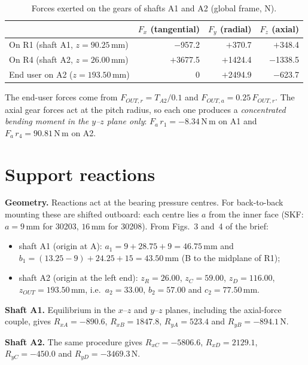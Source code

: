 \documentclass[11pt,a4paper]{article}
\begin{document}
\begin{table}[H]\centering\small
\caption{Forces exerted on the gears of shafts A1 and A2 (global frame, N).}
\begin{tabular}{lrrr}\toprule
 & $F_x$ (tangential) & $F_y$ (radial) & $F_z$ (axial)\\\midrule
On R1 (shaft A1, $z=90.25$\,mm) & $-$957.2 & $+$370.7 & $+$348.4\\
On R4 (shaft A2, $z=26.00$\,mm) & $+$3677.5 & $+$1424.4 & \ensuremath{-}1338.5\\
End user on A2 ($z=193.50$\,mm) & 0 & $+$2494.9 & \ensuremath{-}623.7\\\bottomrule
\end{tabular}\end{table}
The end-user forces come from $F_{OUT,r}=T_{A2}/0.1$ and $F_{OUT,a}=0.25\,F_{OUT,r}$. The axial gear forces act at the pitch radius, so each one produces a \emph{concentrated bending moment in the $y$--$z$ plane only}: $F_{a}\,r_1=\ensuremath{-}8.34$\,N\,m on A1 and $F_{a}\,r_4=90.81$\,N\,m on A2.

\section{Support reactions}
\textbf{Geometry.} Reactions act at the bearing pressure centres. For back-to-back mounting these are shifted outboard: each centre lies $a$ from the inner face (SKF: $a=9$\,mm for 30203, $16$\,mm for 30208). From Figs.~3 and~4 of the brief:
\begin{itemize}
\item shaft A1 (origin at A): $a_1=9+28.75+9=46.75$\,mm and $b_1=(13.25-9)+24.25+15=43.50$\,mm (B to the midplane of R1);
\item shaft A2 (origin at the left end): $z_R=26.00$, $z_C=59.00$, $z_D=116.00$, $z_{OUT}=193.50$\,mm, i.e.\ $a_2=33.00$, $b_2=57.00$ and $c_2=77.50$\,mm.
\end{itemize}

\textbf{Shaft A1.} Equilibrium in the $x$--$z$ and $y$--$z$ planes, including the axial-force couple, gives $R_{xA}=\ensuremath{-}890.6$, $R_{xB}=1847.8$, $R_{yA}=523.4$ and $R_{yB}=\ensuremath{-}894.1$\,N.

\textbf{Shaft A2.} The same procedure gives $R_{xC}=\ensuremath{-}5806.6$, $R_{xD}=2129.1$, $R_{yC}=\ensuremath{-}450.0$ and $R_{yD}=\ensuremath{-}3469.3$\,N.
\end{document}

